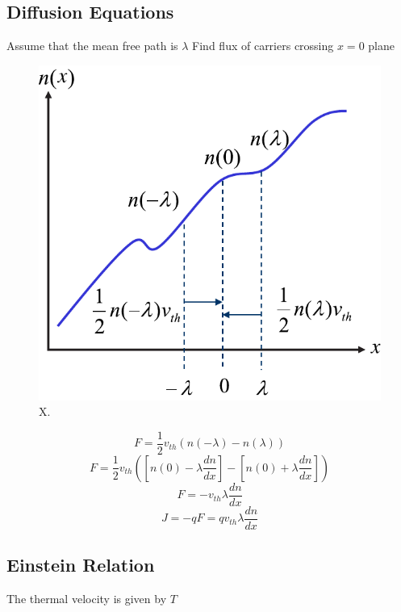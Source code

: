 \subsection{Diffusion Equations}
  
 Assume that the mean free path is $\lambda$
 Find flux of carriers crossing $x=0$ plane
 



\begin{figure}
\begin{center}
\includegraphics[width=.5\columnwidth]{slide48}
\end{center}
\caption{X. } \label{fig:slide48}
\end{figure}

\begin{equation}
	F = \frac{1}{2}{v_{th}}\left( {n( - \lambda ) - n(\lambda )} \right)
\end{equation}
\begin{equation}
	F = \frac{1}{2}{v_{th}}\left( {\left[ {n(0) - \lambda \frac{{dn}}{{dx}}} \right] -
	 \left[ {n(0) + \lambda \frac{{dn}}{{dx}}} \right]} \right)
\end{equation}
\begin{equation}
	F =  - {v_{th}}\lambda \frac{{dn}}{{dx}}
\end{equation}
\begin{equation}
	J =  - qF = q{v_{th}}\lambda \frac{{dn}}{{dx}}
\end{equation}






\subsection{Einstein Relation}
  
 The thermal velocity is given by $T$
 

